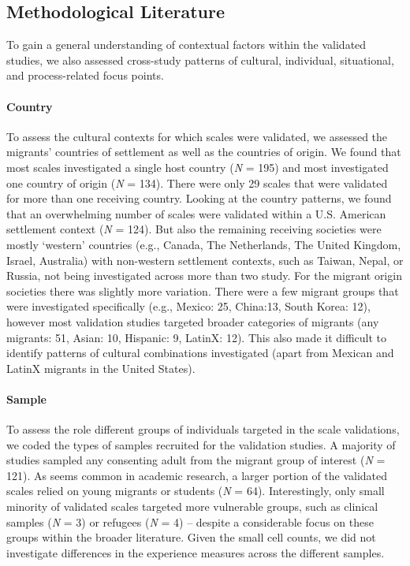 \subsection{Methodological Literature}

To gain a general understanding of contextual factors within the
validated studies, we also assessed cross-study patterns of cultural,
individual, situational, and process-related focus points.

\paragraph{Country}

To assess the cultural contexts for which scales were validated, we
assessed the migrants' countries of settlement as well as the countries
of origin. We found that most scales investigated a single host country
(\textit{N} = 195) and most investigated one country of origin
(\textit{N} = 134). There were only 29 scales that were validated for
more than one receiving country. Looking at the country patterns, we
found that an overwhelming number of scales were validated within a U.S.
American settlement context (\textit{N} = 124). But also the remaining
receiving societies were mostly `western' countries (e.g., Canada, The
Netherlands, The United Kingdom, Israel, Australia) with non-western
settlement contexts, such as Taiwan, Nepal, or Russia, not being
investigated across more than two study. For the migrant origin
societies there was slightly more variation. There were a few migrant
groups that were investigated specifically (e.g., Mexico: 25, China:13,
South Korea: 12), however most validation studies targeted broader
categories of migrants (any migrants: 51, Asian: 10, Hispanic: 9,
LatinX: 12). This also made it difficult to identify patterns of
cultural combinations investigated (apart from Mexican and LatinX
migrants in the United States).

\paragraph{Sample}

To assess the role different groups of individuals targeted in the scale
validations, we coded the types of samples recruited for the validation
studies. A majority of studies sampled any consenting adult from the
migrant group of interest (\textit{N} = 121). As seems common in
academic research, a larger portion of the validated scales relied on
young migrants or students (\textit{N} = 64). Interestingly, only small
minority of validated scales targeted more vulnerable groups, such as
clinical samples (\textit{N} = 3) or refugees (\textit{N} = 4) --
despite a considerable focus on these groups within the broader
literature. Given the small cell counts, we did not investigate
differences in the experience measures across the different samples.

